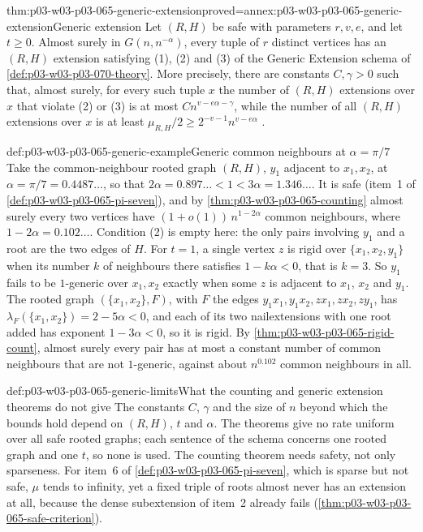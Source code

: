 \begin{hbtheorem}{thm:p03-w03-p03-065-generic-extension}{proved=annex:p03-w03-p03-065-generic-extension}{Generic extension}
Let \((R,H)\) be safe with parameters \(r,v,e\), and let \(t\geq0\).  Almost
surely in \(G(n,n^{-\alpha})\), every tuple of \(r\) distinct vertices has an
\((R,H)\) extension satisfying (1), (2) and (3) of the Generic Extension
schema of \cref{def:p03-w03-p03-070-theory}.  More precisely, there are
constants \(C,\gamma>0\) such that, almost surely, for every such tuple \(x\)
the number of \((R,H)\) extensions over \(x\) that violate (2) or (3) is at
most \(Cn^{v-e\alpha-\gamma}\), while the number of all \((R,H)\) extensions
over \(x\) is at least \(\mu_{R,H}/2\geq2^{-v-1}n^{v-e\alpha}\)
\cite[pp.~10--11]{Spencer2007LogicRandomStructuresAuthor}.
\end{hbtheorem}

\begin{hbexample}{def:p03-w03-p03-065-generic-example}{Generic common neighbours at \(\alpha=\pi/7\)}
Take the common-neighbour rooted graph \((R,H)\), \(y_1\) adjacent to
\(x_1,x_2\), at \(\alpha=\pi/7=0.4487\ldots\), so that
\(2\alpha=0.897\ldots<1<3\alpha=1.346\ldots\).  It is safe (item~1 of
\cref{def:p03-w03-p03-065-pi-seven}), and by
\cref{thm:p03-w03-p03-065-counting} almost surely every two vertices have
\((1+o(1))\,n^{1-2\alpha}\) common neighbours, where
\(1-2\alpha=0.102\ldots\).  Condition (2) is empty here: the only pairs
involving \(y_1\) and a root are the two edges of \(H\).  For \(t=1\), a
single vertex \(z\) is rigid over \(\{x_1,x_2,y_1\}\) when its number \(k\)
of neighbours there satisfies \(1-k\alpha<0\), that is \(k=3\).  So \(y_1\)
fails to be \(1\)-generic over \(x_1,x_2\) exactly when some \(z\) is
adjacent to \(x_1\), \(x_2\) and \(y_1\).  The rooted graph
\((\{x_1,x_2\},F)\), with \(F\) the edges \(y_1x_1,y_1x_2,zx_1,zx_2,zy_1\),
has \(\lambda_F(\{x_1,x_2\})=2-5\alpha<0\), and each of its two
nailextensions with one root added has exponent \(1-3\alpha<0\), so it is
rigid.  By \cref{thm:p03-w03-p03-065-rigid-count}, almost surely every pair
has at most a constant number of common neighbours that are not
\(1\)-generic, against about \(n^{0.102}\) common neighbours in all.
\end{hbexample}

\begin{hbwarning}{def:p03-w03-p03-065-generic-limits}{What the counting and generic extension theorems do not give}
The constants \(C\), \(\gamma\) and the size of \(n\) beyond which the bounds
hold depend on \((R,H)\), \(t\) and \(\alpha\).  The theorems give no rate
uniform over all safe rooted graphs; each sentence of the schema concerns one
rooted graph and one \(t\), so none is used.  The counting theorem needs
safety, not only sparseness.  For item~6 of
\cref{def:p03-w03-p03-065-pi-seven}, which is sparse but not safe,
\(\mu\) tends to infinity, yet a fixed triple of roots almost never has an
extension at all, because the dense subextension of item~2 already fails
(\cref{thm:p03-w03-p03-065-safe-criterion}).
\end{hbwarning}

